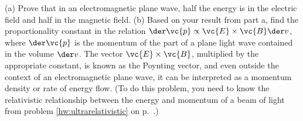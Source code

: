 (a) Prove that in an electromagnetic plane wave, half the energy
        is in the electric field and half in the magnetic field.\hwendpart
(b) Based on your result from part a, find the proportionality
constant in the relation $\der\vc{p}\propto\vc{E}\times\vc{B}\der v$,
where $\der \vc{p}$ is the momentum of the part of a plane light wave
contained in the volume $\der v$. The vector $\vc{E}\times\vc{B}$,
multiplied by the appropriate constant, is known as the Poynting
vector, and even outside the context of an electromagnetic plane wave,
it can be interpreted as a momentum density or rate of
energy flow. (To do this problem, you need to know the relativistic
relationship between the energy and momentum of a beam of
light from problem \ref{hw:ultrarelativistic} on p.~\pageref{hw:ultrarelativistic}.)\answercheck

